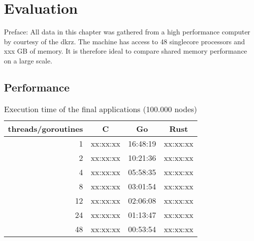 \chapter{Evaluation}
\label{ch:Evaluation}


Preface: All data in this chapter was gathered from a high performance computer by courtesy of the \gls{dkrz}. The machine has access to 48 singlecore processors and xxx GB of memory. It is therefore ideal to compare shared memory performance on a large scale.

\section{Performance}
\label{sec:Evaluaton::Performance}

\begin{table}[htb]
    \centering
    \begin{tabular}{rccc}
        \toprule
            threads/goroutines
            & C
            & Go
            & Rust \\
        \midrule

            1
            & xx:xx:xx
            & 16:48:19
            & xx:xx:xx\\

            2
            & xx:xx:xx
            & 10:21:36
            & xx:xx:xx\\

            4
            & xx:xx:xx
            & 05:58:35
            & xx:xx:xx\\

            8
            & xx:xx:xx
            & 03:01:54
            & xx:xx:xx\\

            12
            & xx:xx:xx
            & 02:06:08
            & xx:xx:xx\\

            24
            & xx:xx:xx
            & 01:13:47
            & xx:xx:xx\\

            48
            & xx:xx:xx
            & 00:53:54
            & xx:xx:xx\\

        \bottomrule
    \end{tabular}
    \caption{Execution time of the final applications (100.000 nodes)}
    \label{tb:final_execution_time}
\end{table}

